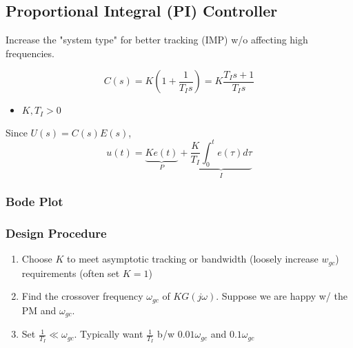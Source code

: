\subsection{Proportional Integral (PI) Controller}
\begin{motivation}
    Increase the "system type" for better tracking (IMP) w/o affecting high frequencies. 
\end{motivation}

\begin{definition}
    \begin{equation}
        C(s) = K \left(1 + \frac{1}{T_I s}\right) = K \frac{T_I s + 1}{T_I s}
    \end{equation}
    \begin{itemize}
        \item $K,T_I > 0$
    \end{itemize}
    \vspace{1em}

    Since $U(s) = C(s)E(s)$, 
    \begin{equation}
        u(t) = \underbrace{K e(t)}_{P} + \underbrace{\frac{K}{T_I} \int_0^t e(\tau) d\tau}_{I}
    \end{equation}
\end{definition}

\subsubsection{Bode Plot}
\begin{notes}
\end{notes}

\subsubsection{Design Procedure}
\begin{process}
    \begin{enumerate}
        \item Choose $K$ to meet asymptotic tracking or bandwidth (loosely increase $w_{gc}$) requirements (often set $K = 1$)
        \item Find the crossover frequency $\omega_{gc}$ of $K G(j \omega)$. Suppose we are happy w/ the PM and $\omega_{gc}$. 
        \item Set $\frac{1}{T_I} \ll \omega_{gc}$. Typically want $\frac{1}{T_I}$ b/w $0.01 \omega_{gc}$ and $0.1 \omega_{gc}$
    \end{enumerate}
\end{process}

